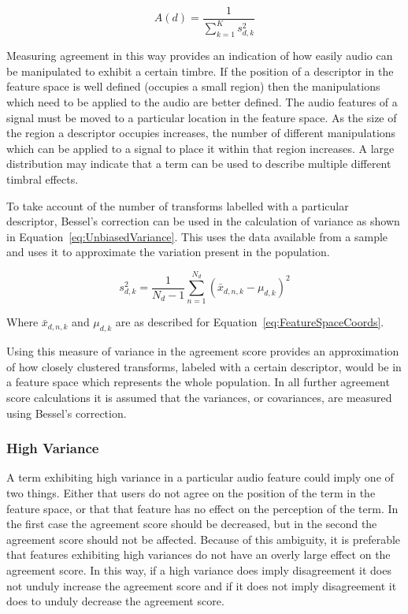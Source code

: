			\begin{equation}
				A(d) = \frac{1}{\sum_{k = 1}^{K} s_{d,k}^{2}}
				\label{eq:ReciprocalOfSumAgreement}
			\end{equation}

			Measuring agreement in this way provides an indication of how easily audio can be manipulated to
			exhibit a certain timbre. If the position of a descriptor in the feature space is well defined
			(occupies a small region) then the manipulations which need to be applied to the audio are better
			defined. The audio features of a signal must be moved to a particular location in the feature
			space. As the size of the region a descriptor occupies increases, the number of different
			manipulations which can be applied to a signal to place it within that region increases. A large
			distribution may indicate that a term can be used to describe multiple different timbral effects.

			To take account of the number of transforms labelled with a particular descriptor, Bessel's
			correction can be used in the calculation of variance as shown in
			Equation~\ref{eq:UnbiasedVariance}. This uses the data available from a sample and uses it to
			approximate the variation present in the population.

			\begin{equation}
				s_{d,k}^{2} = \frac{1}{N_{d} - 1} \sum_{n = 1}^{N_{d}} (\bar{x}_{d,n,k} - \mu_{d,k})^{2}
				\label{eq:UnbiasedVariance}
			\end{equation}

			Where $\bar{x}_{d,n,k}$ and $\mu_{d,k}$ are as described for Equation~\ref{eq:FeatureSpaceCoords}.

			Using this measure of variance in the agreement score provides an approximation of how closely
			clustered transforms, labeled with a certain descriptor, would be in a feature space which
			represents the whole population. In all further agreement score calculations it is assumed that the
			variances, or covariances, are measured using Bessel's correction.

		\subsubsection*{High Variance}
			A term exhibiting high variance in a particular audio feature could imply one of two things. Either
			that users do not agree on the position of the term in the feature space, or that that feature has
			no effect on the perception of the term. In the first case the agreement score should be decreased,
			but in the second the agreement score should not be affected. Because of this ambiguity, it is
			preferable that features exhibiting high variances do not have an overly large effect on the
			agreement score.  In this way, if a high variance does imply disagreement it does not unduly
			increase the agreement score and if it does not imply disagreement it does to unduly decrease the
			agreement score.
			
